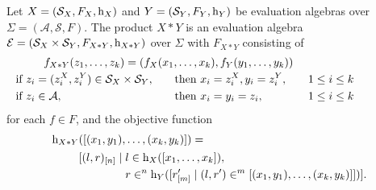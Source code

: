 \documentclass[
    a4paper,
    12pt,
    twoside,
    BCOR=12mm,
    parskip=half,
    chapterprefix,
    numbers=noenddot,
    bibliography=totoc
]{scrbook}
\begin{document}
\begin{definition}
	Let $X=(\mathcal{S}_X,F_X,\mathrm{h}_X)$ and $Y=(\mathcal{S}_Y,F_Y,\mathrm{h}_Y)$ be evaluation algebras over $\Sigma=(\mathcal{A},\mathcal{S},F)$. The product $X * Y$ is an evaluation algebra $\mathcal{E}=(\mathcal{S}_X \times \mathcal{S}_Y,F_{X * Y},\mathrm{h}_{X * Y})$ over $\Sigma$ with $F_{X * Y}$ consisting of
	\begin{alignat}{3}
		\noalign{$\quad f_{X * Y}(z_1,\ldots,z_k) = (f_X(x_1,\ldots,x_k), f_Y(y_1,\ldots,y_k))$}
		&\text{if } z_i=(z^X_i,z^Y_i) \in \mathcal{S}_X \times \mathcal{S}_Y, &&\quad\text{then } x_i=z^X_i , y_i=z^Y_i, &&\quad 1 \leq i \leq k\\
		&\text{if } z_i \in \mathcal{A}, &&\quad\text{then } x_i=y_i=z_i, &&\quad 1 \leq i \leq k \notag
	\end{alignat}
	for each $f \in F$, and the objective function
	\begin{equation}
		\begin{aligned}
			\op{h}_{X * Y}&([(x_1,y_1),\ldots,(x_k,y_k)]) =\\
			&\begin{aligned}
			[(l,r)_{[n]} \mid\; &l \in \op{h}_X ([x_1,\ldots,x_k]), \\
			& r \in^n \op{h}_Y ([ r'_{[m]} \mid (l,r') \in^m [(x_1,y_1),\ldots,(x_k,y_k)]]) ].
			\end{aligned}
		\end{aligned}
	\end{equation}
\end{definition}
\end{document}
